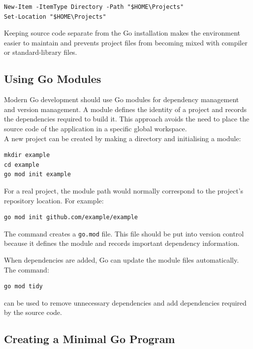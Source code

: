 \begin{lstlisting}
New-Item -ItemType Directory -Path "$HOME\Projects"
Set-Location "$HOME\Projects"
\end{lstlisting}

Keeping source code separate from the Go installation makes the environment easier to maintain and prevents project files from becoming mixed with compiler or standard-library files.

\subsection{Using Go Modules}

Modern Go development should use Go modules for dependency management and version management. A module defines the identity of a project and records the dependencies required to build it. This approach avoids the need to place the source code of the application in a specific global workspace.\\

A new project can be created by making a directory and initialising a module:

\begin{lstlisting}
mkdir example
cd example
go mod init example
\end{lstlisting}

For a real project, the module path would normally correspond to the project's repository location. For example:

\begin{lstlisting}
go mod init github.com/example/example
\end{lstlisting}

The command creates a \texttt{go.mod} file. This file should be put into version control because it defines the module and records important dependency information.

When dependencies are added, Go can update the module files automatically. The command:

\begin{lstlisting}
go mod tidy
\end{lstlisting}

can be used to remove unnecessary dependencies and add dependencies required by the source code.

\subsection{Creating a Minimal Go Program}

